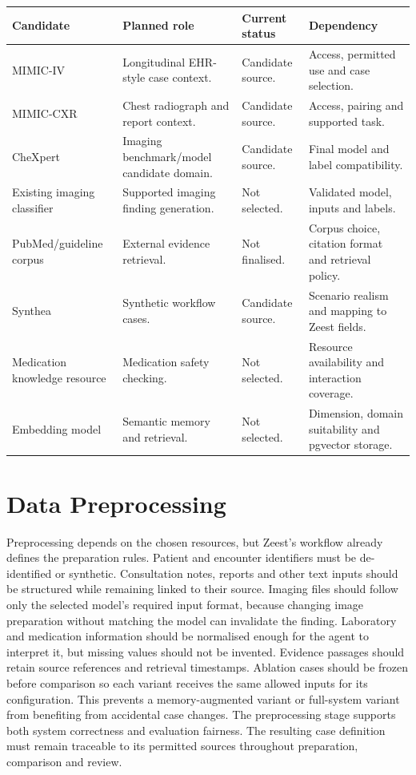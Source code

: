 \begin{reporttable}
\centering
\scriptsize
\caption{Proposed dataset, model and resource register for Zeest methodology.}
\label{tab:fatima:dataset-register}
\begin{tabular}{|p{}|p{}|p{}|p{}|}
\hline
Candidate & Planned role & Current status & Dependency \\ \hline
MIMIC-IV \cite{zeestA:mimicIV} & Longitudinal EHR-style case context. & Candidate source. & Access, permitted use and case selection. \\ \hline
MIMIC-CXR \cite{zeestB:mimiccxr} & Chest radiograph and report context. & Candidate source. & Access, pairing and supported task. \\ \hline
CheXpert \cite{zeestB:chexpert} & Imaging benchmark/model candidate domain. & Candidate source. & Final model and label compatibility. \\ \hline
Existing imaging classifier & Supported imaging finding generation. & Not selected. & Validated model, inputs and labels. \\ \hline
PubMed/guideline corpus & External evidence retrieval. & Not finalised. & Corpus choice, citation format and retrieval policy. \\ \hline
Synthea \cite{zeestB:synthea} & Synthetic workflow cases. & Candidate source. & Scenario realism and mapping to Zeest fields. \\ \hline
Medication knowledge resource & Medication safety checking. & Not selected. & Resource availability and interaction coverage. \\ \hline
Embedding model & Semantic memory and retrieval. & Not selected. & Dimension, domain suitability and pgvector storage. \\ \hline
\end{tabular}
\end{reporttable}

\section{Data Preprocessing}

Preprocessing depends on the chosen resources, but Zeest's workflow already defines the preparation rules. Patient and encounter identifiers must be de-identified or synthetic. Consultation notes, reports and other text inputs should be structured while remaining linked to their source. Imaging files should follow only the selected model's required input format, because changing image preparation without matching the model can invalidate the finding. Laboratory and medication information should be normalised enough for the agent to interpret it, but missing values should not be invented. Evidence passages should retain source references and retrieval timestamps. Ablation cases should be frozen before comparison so each variant receives the same allowed inputs for its configuration. This prevents a memory-augmented variant or full-system variant from benefiting from accidental case changes. The preprocessing stage supports both system correctness and evaluation fairness. The resulting case definition must remain traceable to its permitted sources throughout preparation, comparison and review.

